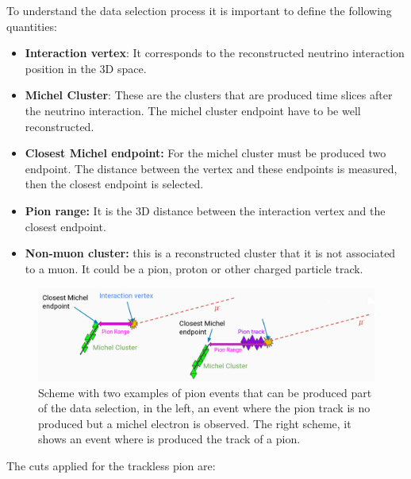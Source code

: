 To understand the data selection process it is important to define the following quantities:
\begin{itemize}
    \item \textbf{Interaction vertex}: It corresponds to the reconstructed neutrino interaction position in the 3D space. 
    \item \textbf{Michel Cluster}: These are the clusters that are produced time slices after the neutrino interaction. The michel cluster endpoint have to be well reconstructed. 
    \item \textbf{Closest Michel endpoint:} For the michel cluster must be produced two endpoint. The distance between the vertex and these endpoints is measured, then the closest endpoint is selected.
    \item \textbf{Pion range:} It is the 3D distance between the interaction vertex and the closest endpoint.
    \item \textbf{Non-muon cluster:} this is a reconstructed cluster that it is not associated to a muon. It could be a pion, proton or other charged particle track. 
\end{itemize}
\begin{figure}
    \centering
    \includegraphics[scale=0.33]{Figures/Chapter4/DataSelection/TracklessPions.png}
    \caption{Scheme with two examples of pion events that can be produced part of the data selection, in the left, an event where the pion track is no produced but a michel electron is observed. The right scheme, it shows an event where is produced the track of a pion. }
    \label{fig:Analysis:Cuts:Untracked:MichelEventSheme}
\end{figure}

The cuts applied for the trackless pion are:

